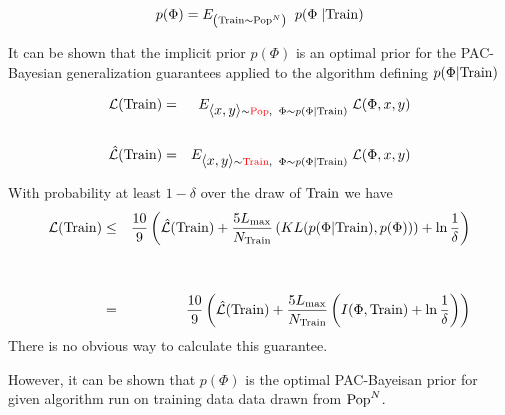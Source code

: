 {\vfill
$$p(\Phi) = E_{\left(\mathrm{Train} \sim \mathrm{Pop}^N\right)}\;\;p(\Phi\;|\mathrm{Train})$$

\vfill
It can be shown that the implicit prior $p(\Phi)$ is an optimal prior for the PAC-Bayesian generalization guarantees applied to the algorithm defining $p(\Phi|\mathrm{Train})$

\vfill
{}

\begin{eqnarray*}
{\cal L}(\mathrm{Train}) & = & E_{{\mbox{$\langle x,y\rangle$}} \sim {\color{red}  \mathrm{Pop}}, \;\;\Phi \sim p(\Phi|\mathrm{Train})}\;{\cal L}(\Phi,x,y) \\
\\
\hat{\cal L}(\mathrm{Train}) & = & E_{{\mbox{$\langle x,y\rangle$}} \sim {\color{red} \mathrm{Train}}, \;\;\Phi \sim p(\Phi|\mathrm{Train})}\;{\cal L}(\Phi,x,y)
\end{eqnarray*}


With probability at least $1-\delta$ over the draw of $\mathrm{Train}$ we have
\vfill
{\huge
\begin{eqnarray*}
{\cal L}(\mathrm{Train}) & \leq & \frac{10}{9}\left( \hat{\cal L}(\mathrm{Train}) + \frac{5L_{\max}}{N_\mathrm{Train}}\left(KL(p(\Phi|\mathrm{Train}),p(\Phi)\right))+ \ln\frac{1}{\delta}\right) \\
\\
\\
& = & \frac{10}{9}\left( \hat{\cal L}(\mathrm{Train}) + \frac{5L_{\max}}{N_\mathrm{Train}}\left(I(\Phi,\mathrm{Train})+ \ln\frac{1}{\delta}\right)\right)
\end{eqnarray*}
}
\vfill
There is no obvious way to calculate this guarantee.

\vfill
However, it can be shown that $p(\Phi)$ is the optimal PAC-Bayeisan prior for given algorithm run on training data data drawn from $\mathrm{Pop}^N$.


}

